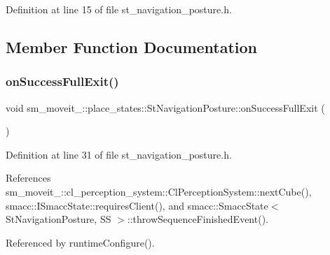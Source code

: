 Definition at line 15 of file st\+\_\+navigation\+\_\+posture.\+h.



\subsection{Member Function Documentation}
\mbox{\label{structsm__moveit__4_1_1place__states_1_1StNavigationPosture_a95ab74dae51538aeae46f71b515bc61e}} 
\subsubsection{\texorpdfstring{on\+Success\+Full\+Exit()}{onSuccessFullExit()}}
{\footnotesize\ttfamily void sm\+\_\+moveit\+\_\+::place\+\_\+states\+::\+St\+Navigation\+Posture\+::on\+Success\+Full\+Exit (\begin{DoxyParamCaption}{ }\end{DoxyParamCaption})\hspace{0.3cm}{\ttfamily [inline]}}



Definition at line 31 of file st\+\_\+navigation\+\_\+posture.\+h.



References sm\+\_\+moveit\+\_\+::cl\+\_\+perception\+\_\+system\+::\+Cl\+Perception\+System\+::next\+Cube(), smacc\+::\+I\+Smacc\+State\+::requires\+Client(), and smacc\+::\+Smacc\+State$<$ St\+Navigation\+Posture, S\+S $>$\+::throw\+Sequence\+Finished\+Event().



Referenced by runtime\+Configure().


